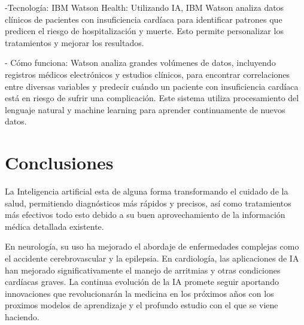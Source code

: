 \documentclass{article}
\begin{document}
\begin{itemize}
    -Tecnología: IBM Watson Health: Utilizando IA, IBM Watson analiza datos clínicos de pacientes con insuficiencia cardíaca para identificar patrones que predicen el riesgo de hospitalización y muerte. Esto permite personalizar los tratamientos y mejorar los resultados.
    
    - Cómo funciona: Watson analiza grandes volúmenes de datos, incluyendo registros médicos electrónicos y estudios clínicos, para encontrar correlaciones entre diversas variables y predecir cuándo un paciente con insuficiencia cardíaca está en riesgo de sufrir una complicación. Este sistema utiliza procesamiento del lenguaje natural y machine learning para aprender continuamente de nuevos datos.
\end{itemize}


\section{Conclusiones}
La Inteligencia artificial esta de alguna forma transformando el cuidado de la salud, permitiendo diagnósticos más rápidos y precisos, así como tratamientos más efectivos todo esto debido a su buen aprovechamiento de la información médica detallada existente.

En neurología, su uso ha mejorado el abordaje de enfermedades complejas como el accidente cerebrovascular y la epilepsia. En cardiología, las aplicaciones de IA han mejorado significativamente el manejo de arritmias y otras condiciones cardíacas graves. La continua evolución de la IA promete seguir aportando innovaciones que revolucionarán la medicina en los próximos años con los proximos modelos de aprendizaje y el profundo estudio con el que se viene haciendo.
\end{document}
